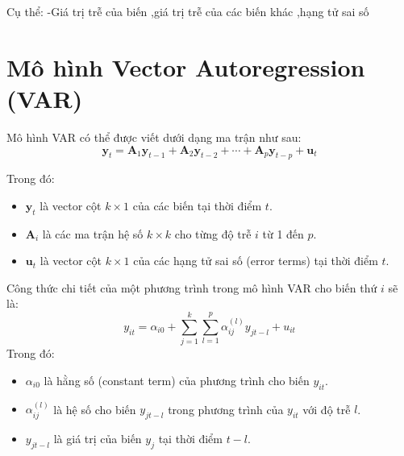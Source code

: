 \documentclass[conference]{IEEEtran}
\begin{document}
Cụ thể:
-Giá trị trễ của biến
,giá trị trễ của các biến khác
,hạng tử sai số



\section*{Mô hình Vector Autoregression (VAR)}

Mô hình VAR có thể được viết dưới dạng ma trận như sau:
\[
\mathbf{y}_t = \mathbf{A}_1 \mathbf{y}_{t-1} + \mathbf{A}_2 \mathbf{y}_{t-2} + \cdots + \mathbf{A}_p \mathbf{y}_{t-p} + \mathbf{u}_t
\]

Trong đó:
\begin{itemize}
    \item \(\mathbf{y}_t\) là vector cột \( k \times 1 \) của các biến tại thời điểm \( t \).
    \item \(\mathbf{A}_i\) là các ma trận hệ số \( k \times k \) cho từng độ trễ \( i \) từ 1 đến \( p \).
    \item \(\mathbf{u}_t\) là vector cột \( k \times 1 \) của các hạng tử sai số (error terms) tại thời điểm \( t \).
\end{itemize}

Công thức chi tiết của một phương trình trong mô hình VAR cho biến thứ \( i \) sẽ là:
\[
y_{it} = \alpha_{i0} + \sum_{j=1}^{k} \sum_{l=1}^{p} \alpha_{ij}^{(l)} y_{jt-l} + u_{it}
\]
Trong đó:
\begin{itemize}
    \item \(\alpha_{i0}\) là hằng số (constant term) của phương trình cho biến \( y_{it} \).
    \item \(\alpha_{ij}^{(l)}\) là hệ số cho biến \( y_{jt-l} \) trong phương trình của \( y_{it} \) với độ trễ \( l \).
    \item \( y_{jt-l} \) là giá trị của biến \( y_j \) tại thời điểm \( t-l \).
\end{itemize}
\end{document}
